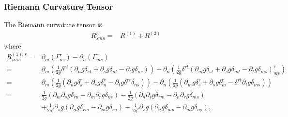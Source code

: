 \subsubsection{Riemann Curvature Tensor}
The Riemann curvature tensor is 
\begin{align}
  R^r_{smn} =& R^{(1)} + R^{(2)}
\end{align}
where 
\begin{align}
R^{(1),r}_{smn}=&\partial_m\left(\Gamma^{r}_{ns}  \right) - \partial_n\left(\Gamma^r_{ms}\right) \\
=& \partial_m\left(\frac{1}{2g}\delta^{rt}(\partial_ng\delta_{st} +\partial_s g\delta_{nt} - \partial_tg\delta _{ns})  \right) - \partial_n\left(\frac{1}{2g}\delta^{rt}(\partial_mg\delta_{st} + \partial_sg\delta_{mt} - \partial_t g \delta_{ms})^r_{ms}\right) \\
=& \partial_m\left(\frac{1}{2g}(\partial_ng\delta^{r}_{s} +\partial_s g\delta^{r}_n - \partial_tg\delta^{rt}\delta _{ns})  \right) - \partial_n\left(\frac{1}{2g}(\partial_mg\delta^{r}_{s} + \partial_sg\delta^{r}_{m} - \delta^{rt}\partial_t g \delta_{ms})\right) \\
=&\frac{1}{2g}(\partial_m\partial_s g\delta_{rn} - \partial_m\partial_rg\delta _{ns})  -\frac{1}{2g}( \partial_n\partial_sg\delta_{rm} - \partial_n\partial_r g \delta_{ms}) \nonumber\\
&+ \frac{1}{2g^2}\partial_s g (\partial_ng\delta_{rm}-\partial_mg \delta_{rn}) - \frac{1}{2g^2}\partial_rg(\partial_ng\delta_{ms} -\partial_mg\delta _{ns}),
\end{align}
